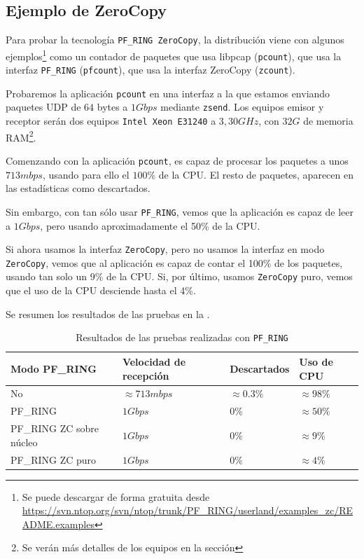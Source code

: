 \subsection{Ejemplo de ZeroCopy}
Para probar la tecnología \texttt{PF\_RING ZeroCopy}, la distribución viene con algunos ejemplos\footnote{Se puede 
descargar de forma gratuita desde 
\url{https://svn.ntop.org/svn/ntop/trunk/PF_RING/userland/examples_zc/README.examples}} como un contador de paquetes 
que usa libpcap (\texttt{pcount}), que usa la interfaz \texttt{PF\_RING} (\texttt{pfcount}), que usa 
la interfaz ZeroCopy (\texttt{zcount}).

Probaremos la aplicación \texttt{pcount} en una interfaz a la que estamos enviando paquetes UDP de $64$ bytes a $1Gbps$ 
mediante \texttt{zsend}. Los equipos emisor y receptor serán dos equipos \texttt{Intel\textregistered{} 
Xeon\textregistered{} E31240} a $3,30GHz$, con $32G$ de memoria RAM\footnote{Se verán más detalles de los equipos en la 
sección }.

Comenzando con la aplicación \texttt{pcount}, es capaz de procesar los paquetes a unos $713mbps$, usando para ello el 
$100\%$ de la CPU. El resto de paquetes,  aparecen en las estadísticas como descartados.

Sin embargo, con tan sólo usar \texttt{PF\_RING}, vemos que la aplicación es capaz de leer a $1Gbps$, pero usando 
aproximadamente el 50\% de la CPU.

Si ahora usamos la interfaz \texttt{ZeroCopy}, pero no usamos la interfaz en modo \texttt{ZeroCopy}, vemos que al 
aplicación es capaz de contar el 100\% de los paquetes, usando tan solo un 9\% de la CPU. Si, por último, usamos 
\texttt{ZeroCopy} puro, vemos que el uso de la CPU desciende hasta el 4\%.

Se resumen los resultados de las pruebas en la .

\begin{table}[htbp]
 \begin{tabular}{llll}
  Modo PF\_RING & Velocidad de recepción & Descartados  & Uso de CPU              \\\hline
  No                       & $\approx 713mbps$ & $\approx0.3\%$  & $\approx{}98\%$ \\
  PF\_RING                 & $1Gbps$           & $0\%$           & $\approx{}50\%$ \\
  PF\_RING ZC sobre núcleo & $1Gbps$           & $0\%$           & $\approx{}9\%$  \\
  PF\_RING ZC puro         & $1Gbps$           & $0\%$           & $\approx{}4\%$
\end{tabular}
  \caption{Resultados de las pruebas realizadas con \texttt{PF\_RING}}
\end{table}

